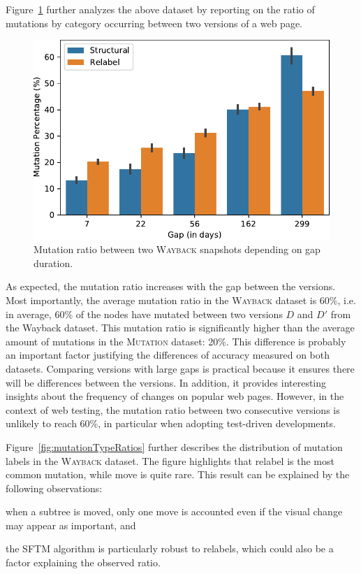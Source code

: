 \documentclass[preprint, 12pt]{elsarticle}
\begin{document}
\vspace{6pt}
Figure~\ref{fig:mutationAmountAnalysis} further analyzes the above dataset by reporting on the ratio of mutations by category occurring between two versions of a web page.

\begin{figure}[]
  \centering
  \includegraphics[width=.8\linewidth]{mutationAmountAnalysis}
  \caption{Mutation ratio between two \textsc{Wayback} snapshots depending on gap duration.}
  \label{fig:mutationAmountAnalysis}
\end{figure}

As expected, the mutation ratio increases with the gap between the versions.
Most importantly, the average mutation ratio in the \textsc{Wayback} dataset is
60\%, i.e. in average, 60\% of the nodes have mutated between two versions $D$
and $D'$ from the Wayback dataset. This mutation ratio is significantly higher
than the average amount of mutations in the \textsc{Mutation} dataset: 20\%.
This difference is probably an important factor justifying the differences of
accuracy measured on both datasets.
% 
Comparing versions with large gaps is practical because it ensures there will be
differences between the versions.
In addition, it provides interesting insights about the frequency of changes on popular web pages.
However, in the context of web testing, the mutation ratio between two consecutive versions is unlikely to reach 60\%, in particular when adopting test-driven developments.

\vspace{6pt}
Figure~\ref{fig:mutationTypeRatios} further describes the distribution of mutation labels in the \textsc{Wayback} dataset.
The figure highlights that \textsf{relabel} is the most common mutation, while \textsf{move} is quite rare.
This result can be explained by the following observations:
\begin{inparaenum}
  \item when a subtree is moved, only one move is accounted even if the visual change may appear as important, and
  \item the SFTM algorithm is particularly robust to relabels, which could also be a factor explaining the observed ratio.
\end{inparaenum}
\end{document}

